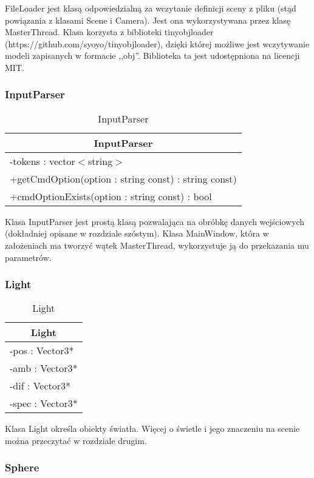 FileLoader jest klasą odpowiedzialną za wczytanie definicji sceny z pliku (stąd powiązania z klasami Scene i Camera). Jest ona wykorzystywana przez klasę MasterThread. Klasa korzysta z biblioteki tinyobjloader (https://github.com/syoyo/tinyobjloader), dzięki której możliwe jest wczytywanie modeli zapisanych w formacie ,,obj''. Biblioteka ta jest udostępniona na licencji MIT.

\subsubsection{InputParser}

\footnotesize
\begin{longtable}{|p{14cm}|}
    \caption{InputParser} \label{tab:InputParser} \\ \hline
    \multicolumn{1}{|c|}{InputParser} \\ \hline
    -tokens : vector$<$string$>$  \\ \hline
    +getCmdOption(option : string const) : string const) \\
    +cmdOptionExists(option : string const) : bool \\ \hline
\end{longtable}
\normalsize

Klasa InputParser jest prostą klasą pozwalająca na obróbkę danych wejściowych (dokładniej opisane w rozdziale szóstym). Klasa MainWindow, która w założeniach ma tworzyć wątek MasterThread, wykorzystuje ją do przekazania mu parametrów.

\subsubsection{Light}

\footnotesize
\begin{longtable}{|p{14cm}|}
    \caption{Light} \label{tab:Light} \\ \hline
    \multicolumn{1}{|c|}{Light} \\ \hline
    -pos : Vector3* \\ 
    -amb : Vector3* \\
    -dif : Vector3* \\
    -spec : Vector3* \\
	\hline
\end{longtable}
\normalsize

Klasa Light określa obiekty światła. Więcej o świetle i jego znaczeniu na scenie można przeczytać w rozdziale drugim.

\subsubsection{Sphere}


